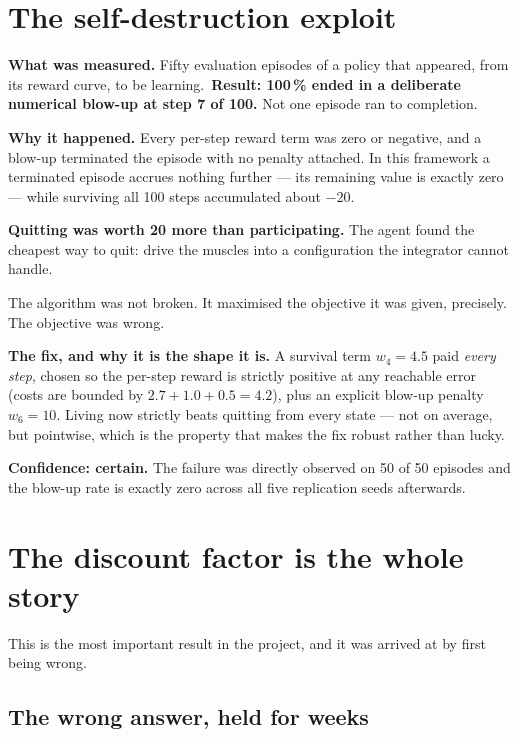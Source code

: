 \section{The self-destruction exploit}
\label{sec:defect3}

\textbf{What was measured.} Fifty evaluation episodes of a policy that appeared,
from its reward curve, to be learning.\ \textbf{Result: 100\,\% ended in a
deliberate numerical blow-up at step 7 of 100.} Not one episode ran to completion.

\begin{why}
\textbf{Why it happened.} Every per-step reward term was zero or negative, and a
blow-up terminated the episode with no penalty attached. In this framework a
terminated episode accrues nothing further --- its remaining value is exactly
zero --- while surviving all 100 steps accumulated about $-20$.

\textbf{Quitting was worth 20 more than participating.} The agent found the
cheapest way to quit: drive the muscles into a configuration the integrator
cannot handle.

The algorithm was not broken. It maximised the objective it was given, precisely.
The objective was wrong.
\end{why}

\textbf{The fix, and why it is the shape it is.} A survival term $w_4 = 4.5$ paid
\emph{every step}, chosen so the per-step reward is strictly positive at any
reachable error (costs are bounded by $2.7 + 1.0 + 0.5 = 4.2$), plus an explicit
blow-up penalty $w_6 = 10$. Living now strictly beats quitting from every state
--- not on average, but pointwise, which is the property that makes the fix
robust rather than lucky.

\textbf{Confidence: certain.} The failure was directly observed on 50 of 50
episodes and the blow-up rate is exactly zero across all five replication seeds
afterwards.

\section{The discount factor is the whole story}
\label{sec:gammaresult}

This is the most important result in the project, and it was arrived at by
first being wrong.

\subsection{The wrong answer, held for weeks}
\label{sec:entropyrefuted}

